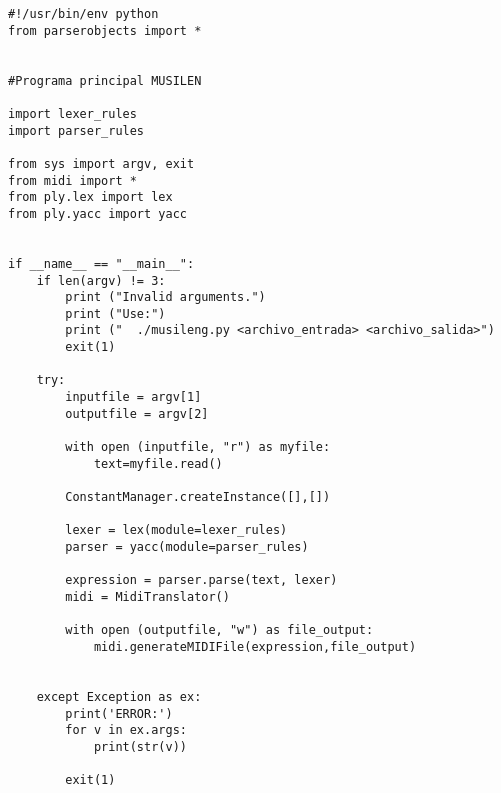 
\begin{verbatim}
#!/usr/bin/env python
from parserobjects import *


#Programa principal MUSILEN

import lexer_rules
import parser_rules

from sys import argv, exit
from midi import *
from ply.lex import lex
from ply.yacc import yacc


if __name__ == "__main__":
    if len(argv) != 3:
        print ("Invalid arguments.")
        print ("Use:")
        print ("  ./musileng.py <archivo_entrada> <archivo_salida>")
        exit(1)

    try:
        inputfile = argv[1]
        outputfile = argv[2]

        with open (inputfile, "r") as myfile:
            text=myfile.read()

        ConstantManager.createInstance([],[])

        lexer = lex(module=lexer_rules)
        parser = yacc(module=parser_rules)

        expression = parser.parse(text, lexer)
        midi = MidiTranslator()

        with open (outputfile, "w") as file_output:
            midi.generateMIDIFile(expression,file_output)


    except Exception as ex:
        print('ERROR:')
        for v in ex.args:
            print(str(v))

        exit(1)
\end{verbatim}


